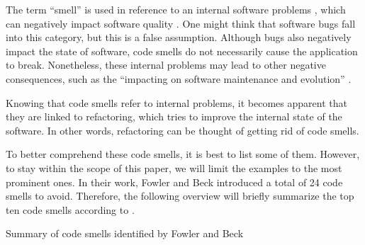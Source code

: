 The term “smell” is used in reference to an internal software problems
	\textcite[p.~2]{lacerda2020}, 
	which can negatively impact software quality 
	\cite[p.~1]{sonnleithner2021}. 
One might think that software bugs fall into this category, 
	but this is a false assumption.
Although bugs also negatively impact the state of software, 
	code smells do not necessarily cause the application to break.
Nonetheless, these internal problems may lead to other negative consequences,
	such as the “impacting on software maintenance and evolution”
	\cite[p.~2]{lacerda2020}.
 

Knowing that code smells refer to internal problems,
	it becomes apparent that they are linked to refactoring, 
	which tries to improve the internal state of the software.
In other words, 
	refactoring can be thought of getting rid of code smells. 

To better comprehend these code smells, it is best to list some of them. 
However, to stay within the scope of this paper, 
	we will limit the examples to the most prominent ones. 
In their work, Fowler and Beck introduced a total of 24 code smells to avoid.
Therefore, 
	the following overview will briefly summarize 
	the top ten code smells according to 
	\textcite{lacerda2020}.

Summary of code smells identified by Fowler and Beck \textcite{fowler2018}

